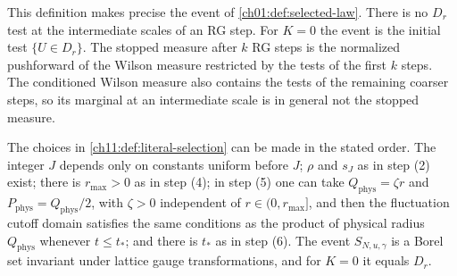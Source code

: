 This definition makes precise the event of \cref{ch01:def:selected-law}. There is no $D_r$ test at the intermediate scales of an RG step. For $K=0$ the event is the initial test $\{U\in D_r\}$. The stopped measure after $k$ RG steps is the normalized pushforward of the Wilson measure restricted by the tests of the first $k$ steps. The conditioned Wilson measure also contains the tests of the remaining coarser steps, so its marginal at an intermediate scale is in general not the stopped measure.

\begin{lemma}\label{ch11:lem:parameter-feasibility}
The choices in \cref{ch11:def:literal-selection} can be made in the stated order. The integer $J$ depends only on constants uniform before $J$; $\rho$ and $s_J$ as in step (2) exist; there is $r_{\max}>0$ as in step (4); in step (5) one can take $Q_{\mathrm{phys}}=\zeta r$ and $P_{\mathrm{phys}}=Q_{\mathrm{phys}}/2$, with $\zeta>0$ independent of $r\in(0,r_{\max}]$, and then the fluctuation cutoff domain satisfies the same conditions as the product of physical radius $Q_{\mathrm{phys}}$ whenever $t\le t_*$; and there is $t_*$ as in step (6). The event $S_{N,u,\gamma}$ is a Borel set invariant under lattice gauge transformations, and for $K=0$ it equals $D_r$.
\end{lemma}

